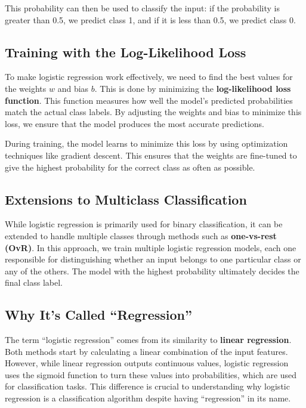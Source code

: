     This probability can then be used to classify the input: if the probability is greater than 0.5, we predict class 1, and if it is less than 0.5, we predict class 0.

\subsection{Training with the Log-Likelihood Loss}
    \large To make logistic regression work effectively, we need to find the best values for the weights \( w \) and bias \( b \). This is done by minimizing the \textbf{log-likelihood loss function}. This function measures how well the model’s predicted probabilities match the actual class labels. By adjusting the weights and bias to minimize this loss, we ensure that the model produces the most accurate predictions.

    During training, the model learns to minimize this loss by using optimization techniques like gradient descent. This ensures that the weights are fine-tuned to give the highest probability for the correct class as often as possible.

\subsection{Extensions to Multiclass Classification}
    \large While logistic regression is primarily used for binary classification, it can be extended to handle multiple classes through methods such as \textbf{one-vs-rest (OvR)}. In this approach, we train multiple logistic regression models, each one responsible for distinguishing whether an input belongs to one particular class or any of the others. The model with the highest probability ultimately decides the final class label.

\subsection{Why It's Called “Regression”}
    \large The term ``logistic regression'' comes from its similarity to \textbf{linear regression}. Both methods start by calculating a linear combination of the input features. However, while linear regression outputs continuous values, logistic regression uses the sigmoid function to turn these values into probabilities, which are used for classification tasks. This difference is crucial to understanding why logistic regression is a classification algorithm despite having ``regression'' in its name.

